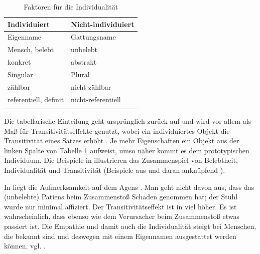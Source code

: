 \begin{table}[h]
\begin{tabular}{ll}
\lsptoprule
Individuiert & Nicht-individuiert\\ \midrule
Eigenname                    & Gattungsname         \\
Mensch, belebt               & unbelebt             \\
konkret                      & abstrakt             \\
Singular                     & Plural               \\
zählbar                      & nicht zählbar        \\
referentiell, definit        & nicht-referentiell   \\ \lspbottomrule
\end{tabular}
\caption{Faktoren für die Individualität \parencite[253]{Hopper1980}\label{tab:indi}}
\end{table}

Die tabellarische Einteilung geht ursprünglich zurück auf \textcite{Timberlake1975,Timberlake1977} und wird vor allem als Maß für Transitivitätseffekte genutzt, wobei ein individuiertes Objekt die Transitivität eines Satzes erhöht \parencite[s. auch][]{Gillmann2016}. Je mehr Eigenschaften ein Objekt aus der linken Spalte von Tabelle \ref{tab:indi} aufweist, umso näher kommt es dem prototypischen Individuum. Die Beispiele in  illustrieren das Zusammenspiel von Belebtheit, Individualität und Transitivität (Beispiele aus \cite[253]{Hopper1980} und daran anknüpfend \cite[344]{Szczepaniak2011}).


\begin{exe}
	\ex \label{ex:stossen}
	\begin{xlist}
		\ex \label{ex:stuhl} 
 		\ex \label{ex:kundin} 
		\ex \label{ex:chalie} 
	\end{xlist}
\end{exe}
\noindent
In  liegt die Aufmerksamkeit auf dem Agens . Man geht nicht davon aus, dass das (unbelebte) Patiens  beim  Zusammenstoß Schaden genommen hat; der Stuhl wurde nur minimal affiziert. Der Transitivitätseffekt ist in  viel höher. Es ist wahrscheinlich, dass  ebenso wie dem Verursacher beim Zusammenstoß etwas passiert ist. Die Empathie und damit auch die Individualität steigt bei Menschen, die bekannt sind und deswegen mit einem Eigennamen ausgestattet werden können, vgl. .


